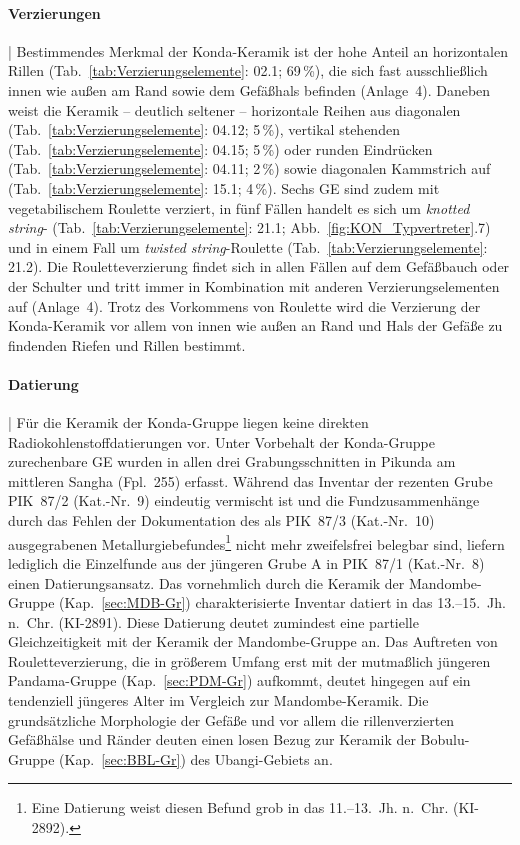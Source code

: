 \paragraph{Verzierungen}\hspace{-.5em}|\hspace{.5em}%
Bestimmendes Merkmal der Konda-Keramik ist der hohe Anteil an horizontalen Rillen (Tab.~\ref{tab:Verzierungselemente}: 02.1; 69\,\%), die sich fast ausschließlich innen wie außen am Rand sowie dem Gefäßhals befinden (Anlage~4). Daneben weist die Keramik -- deutlich seltener -- horizontale Reihen aus diagonalen (Tab.~\ref{tab:Verzierungselemente}: 04.12; 5\,\%), vertikal stehenden (Tab.~\ref{tab:Verzierungselemente}: 04.15; 5\,\%) oder runden Eindrücken (Tab.~\ref{tab:Verzierungselemente}: 04.11; 2\,\%) sowie diagonalen Kammstrich auf (Tab.~\ref{tab:Verzierungselemente}: 15.1; 4\,\%). Sechs GE sind zudem mit vegetabilischem \mbox{Roulette} verziert, in fünf Fällen handelt es sich um \textit{knotted string}- (Tab.~\ref{tab:Verzierungselemente}: 21.1; Abb.~\ref{fig:KON_Typvertreter}.7) und in einem Fall um \textit{twisted string}-\mbox{Roulette} (Tab.~\ref{tab:Verzierungselemente}: 21.2). Die Rouletteverzierung findet sich in allen Fällen auf dem Gefäßbauch oder der Schulter und tritt immer in Kombination mit anderen Verzierungselementen auf (Anlage~4). Trotz des Vorkommens von \mbox{Roulette} wird die Verzierung der Konda-Keramik vor allem von innen wie außen an Rand und Hals der Gefäße zu findenden Riefen und Rillen bestimmt.

\paragraph{Datierung}\hspace{-.5em}|\hspace{.5em}%
Für die Keramik der Konda-Gruppe liegen keine direkten Radiokohlenstoffdatierungen vor. Unter Vorbehalt der Konda-Gruppe zurechenbare GE wurden in allen drei Grabungsschnitten in Pikunda am mittleren \mbox{Sangha} (Fpl.~255) erfasst. Während das Inventar der rezenten Grube PIK~87/2 (Kat.-Nr.~9) eindeutig vermischt ist und die Fundzusammenhänge durch das Fehlen der Dokumentation des als PIK~87/3 (Kat.-Nr.~10) ausgegrabenen Metallurgiebefundes\footnote{Eine Datierung weist diesen Befund grob in das 11.--13.~Jh. n.~Chr. (KI-2892).} nicht mehr zweifelsfrei belegbar sind, liefern lediglich die Einzelfunde aus der jüngeren Grube A in PIK~87/1 (Kat.-Nr.~8) einen Datierungsansatz. Das vornehmlich durch die Keramik der Mandombe-Gruppe (Kap.~\ref{sec:MDB-Gr}) charakterisierte Inventar datiert in das 13.--15.~Jh. n.~Chr. (KI-2891). Diese Datierung deutet zumindest eine partielle Gleichzeitigkeit mit der Keramik der Mandombe-Gruppe an. Das Auftreten von Rouletteverzierung, die in größerem Umfang erst mit der mutmaßlich jüngeren Pandama-Gruppe (Kap.~\ref{sec:PDM-Gr}) aufkommt, deutet hingegen auf ein tendenziell jüngeres Alter im Vergleich zur Mandombe-Keramik. Die grundsätzliche Morphologie der Gefäße und vor allem  die rillenverzierten Gefäßhälse und Ränder deuten einen losen Bezug zur Keramik der Bobulu-Gruppe (Kap.~\ref{sec:BBL-Gr}) des \mbox{Ubangi}-Gebiets an.

